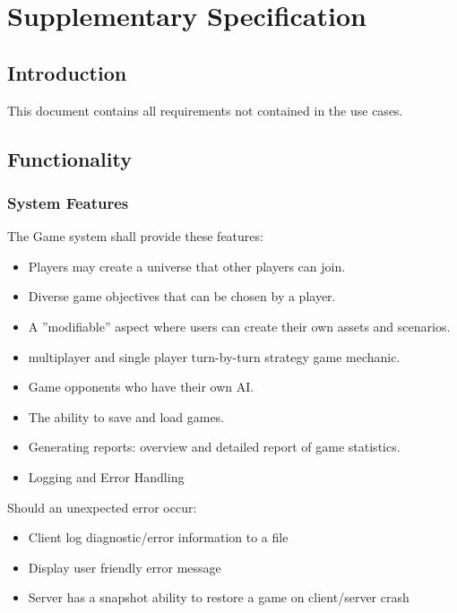 \chapter{Supplementary Specification}

\section{Introduction}

This document contains all requirements not contained in the use cases.

\section{Functionality}

\subsection{System Features}

The Game system shall provide these features:

\begin{itemize}
	\item Players may create a universe that other players can join.
	\item Diverse game objectives that can be chosen by a player.
	\item A ''modifiable'' aspect where users can create their own assets and scenarios.
	\item  multiplayer and single player turn-by-turn strategy game mechanic.
	\item Game opponents who have their own AI.
	\item The ability to save and load games.
	\item Generating reports: overview and detailed report of game statistics.
	\item Logging and Error Handling
\end{itemize}

Should an unexpected error occur:

\begin{itemize}
	\item Client log diagnostic/error information to a file
	\item Display user friendly error message
	\item Server has a snapshot ability to restore a game on client/server crash
\end{itemize}

